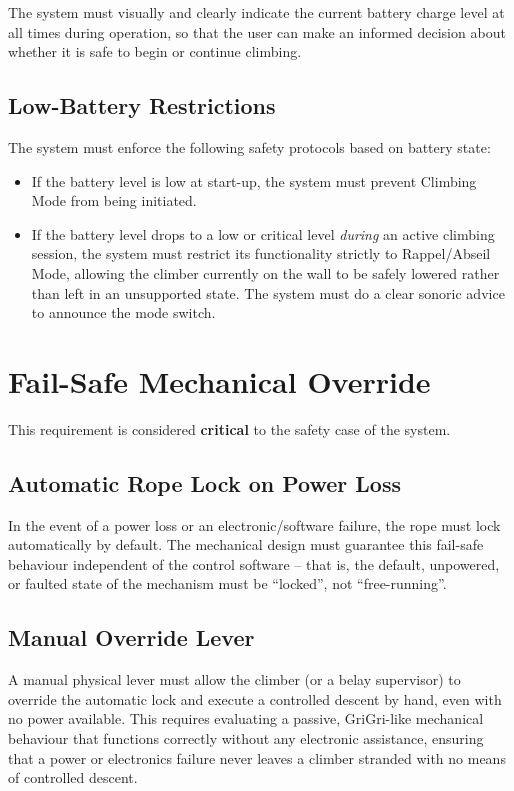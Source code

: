 The system must visually and clearly indicate the current battery charge
level at all times during operation, so that the user can make an
informed decision about whether it is safe to begin or continue climbing.

\subsection{Low-Battery Restrictions}

The system must enforce the following safety protocols based on battery
state:

\begin{itemize}
    \item If the battery level is low at start-up, the system must
        prevent Climbing Mode from being initiated.
    \item If the battery level drops to a low or critical level
        \emph{during} an active climbing session, the system must
        restrict its functionality strictly to Rappel/Abseil Mode,
        allowing the climber currently on the wall to be safely lowered
        rather than left in an unsupported state. The system must do a clear 
        sonoric advice to announce the mode switch.
\end{itemize}

\section{Fail-Safe Mechanical Override}
\label{sec:fr-failsafe}

This requirement is considered \textbf{critical} to the safety case of
the system.

\subsection{Automatic Rope Lock on Power Loss}

In the event of a power loss or an electronic/software failure, the rope
must lock automatically by default. The mechanical design must guarantee
this fail-safe behaviour independent of the control software -- that is,
the default, unpowered, or faulted state of the mechanism must be
``locked'', not ``free-running''.

\subsection{Manual Override Lever}

A manual physical lever must allow the climber (or a belay supervisor) to
override the automatic lock and execute a controlled descent by hand,
even with no power available. This requires evaluating a passive,
GriGri-like mechanical behaviour that functions correctly without any
electronic assistance, ensuring that a power or electronics failure never
leaves a climber stranded with no means of controlled descent.

